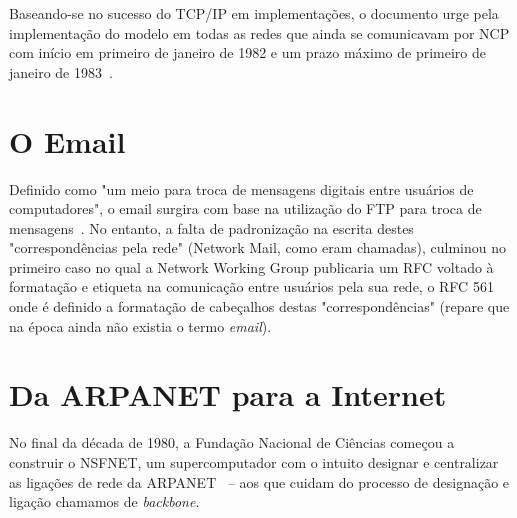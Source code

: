 \documentclass[conference]{IEEEtran}
\begin{document}
  Baseando-se no sucesso do TCP/IP em implementações, o documento urge pela implementação do modelo em todas as redes que ainda se comunicavam por NCP com início em primeiro de janeiro de 1982 e um prazo máximo de primeiro de janeiro  de 1983~\cite{rfc801}.
  

\section{O Email}

	Definido como "um meio para troca de mensagens digitais entre usuários de computadores", o email surgira com base na utilização do FTP para troca de mensagens~\cite{rfc561}. No entanto, a falta de padronização na escrita destes "correspondências pela rede" (Network Mail, como eram chamadas), culminou no primeiro caso no qual a Network Working Group publicaria um RFC voltado à formatação e etiqueta na comunicação entre usuários pela sua rede, o RFC 561 onde é definido a formatação de cabeçalhos destas "correspondências" (repare que na época ainda não existia o termo \emph{email}).~\cite{rfc561}
	
	
  

	
\section{Da ARPANET para a Internet}

  No final da década de 1980, a Fundação Nacional de Ciências começou a
  construir o NSFNET, um supercomputador com o intuito designar e centralizar as
  ligações de rede da ARPANET~\cite{nsfnet} -- aos que cuidam do processo de designação e
  ligação chamamos de \emph{backbone}.
\end{document}

